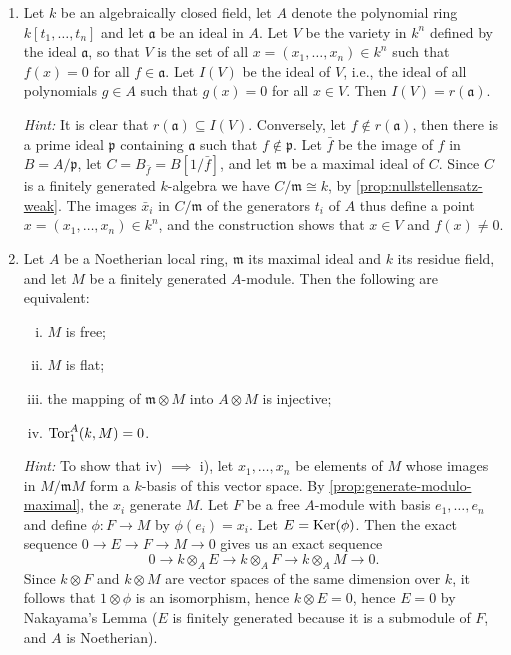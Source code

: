 \begin{enumerate}
    \textit{Nullstellensatz, strong form.}

    \item \label{exer14-chapter7}Let $k$ be an algebraically closed field, let $A$ denote the polynomial ring $k[t_1, \ldots, t_n]$ and let $\mathfrak{a}$ be an ideal in $A$. Let $V$ be the variety in $k^n$ defined by the ideal $\mathfrak{a}$, so that $V$ is the set of all $x = (x_1, \ldots, x_n) \in k^n$ such that $f(x) = 0$ for all $f \in \mathfrak{a}$. Let $I(V)$ be the ideal of $V$, i.e., the ideal of all polynomials $g \in A$ such that $g(x) = 0$ for all $x \in V$. Then $I(V) = r(\mathfrak{a})$.
    
    \textit{Hint:} It is clear that $r(\mathfrak{a}) \subseteq I(V)$. Conversely, let $f \notin r(\mathfrak{a})$, then there is a prime ideal $\mathfrak{p}$ containing $\mathfrak{a}$ such that $f \notin \mathfrak{p}$. Let $\bar{f}$ be the image of $f$ in $B = A/\mathfrak{p}$, let $C = B_{\bar{f}} = B[1/\bar{f}]$, and let $\mathfrak{m}$ be a maximal ideal of $C$. Since $C$ is a finitely generated $k$-algebra we have $C/\mathfrak{m} \cong k$, by \eqref{prop:nullstellensatz-weak}. The images $\bar{x}_i$ in $C/\mathfrak{m}$ of the generators $t_i$ of $A$ thus define a point $x = (x_1, \ldots, x_n) \in k^n$, and the construction shows that $x \in V$ and $f(x) \neq 0$.

    \item \label{exer15-chapter7}Let $A$ be a Noetherian local ring, $\mathfrak{m}$ its maximal ideal and $k$ its residue field, and let $M$ be a finitely generated $A$-module. Then the following are equivalent:
    \begin{enumerate}[i)]
        \item $M$ is free;
        \item $M$ is flat;
        \item the mapping of $\mathfrak{m} \otimes M$ into $A \otimes M$ is injective;
        \item $\operatorname{Tor}_1^A(k, M) = 0$.
    \end{enumerate}
    \textit{Hint:} To show that iv) $\implies$ i), let $x_1, \ldots, x_n$ be elements of $M$ whose images in $M/\mathfrak{m}M$ form a $k$-basis of this vector space. By \eqref{prop:generate-modulo-maximal}, the $x_i$ generate $M$. Let $F$ be a free $A$-module with basis $e_1, \ldots, e_n$ and define $\phi \colon F \to M$ by $\phi(e_i) = x_i$. Let $E = \operatorname{Ker}(\phi)$. Then the exact sequence $0 \longrightarrow E \longrightarrow F \longrightarrow M \longrightarrow 0$ gives us an exact sequence
    \[
    0 \longrightarrow k \otimes_A E \longrightarrow k \otimes_A F \longrightarrow k \otimes_A M \longrightarrow 0.
    \]
    Since $k \otimes F$ and $k \otimes M$ are vector spaces of the same dimension over $k$, it follows that $1 \otimes \phi$ is an isomorphism, hence $k \otimes E = 0$, hence $E = 0$ by Nakayama's Lemma ($E$ is finitely generated because it is a submodule of $F$, and $A$ is Noetherian).


\end{enumerate}
